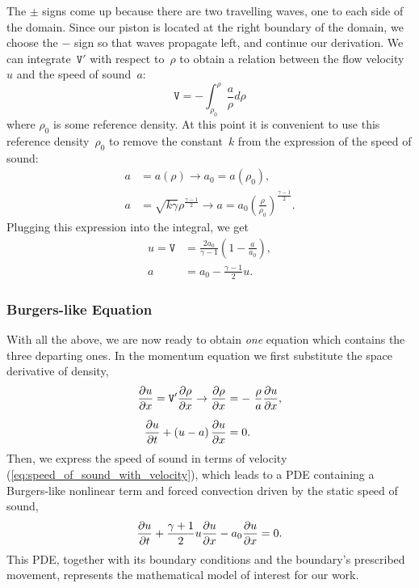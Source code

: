 \documentclass[../../thesis.tex]{subfiles}
\begin{document}
The $\pm$ signs come up because there are two travelling waves, one to each side of the domain.
Since our piston is located at the right boundary of the domain, 
we choose the $-$ sign so that waves propagate left, and continue our derivation.
We can integrate~$\mathtt{V}'$ with respect to~$\rho$ to obtain a relation between the flow velocity~$u$ and the speed of sound~$a$:
\begin{equation}
    \mathtt{V} = - \int_{\rho_0}^{\rho} \frac{a}{\rho} d\rho 
\end{equation}
where $\rho_0$ is some reference density.
At this point it is convenient to use this reference density~$\rho_0$ to remove the constant~$k$ from the expression of the speed of sound:
\begin{subequations}
    \begin{align}
        a &= a(\rho) 
        \rightarrow 
        a_0 = a(\rho_0),
        \\
        a &= \sqrt{k \gamma} \rho^{\frac{\gamma-1}{2}} 
        \rightarrow
        a = a_0 \left(\frac{\rho}{\rho_0}\right)^{\frac{\gamma-1}{2}}.
    \end{align}    
\end{subequations}
Plugging this expression into the integral, we get
\begin{subequations}
    \begin{align}
        u = \mathtt{V} &= \frac{2a_0}{\gamma-1}\left(1 - \frac{a}{a_0}\right),
        \\[2mm]
        a &= a_0 - \frac{\gamma-1}{2}u. \label{eq:speed_of_sound_with_velocity}
    \end{align}
\end{subequations}

\subsubsection{Burgers-like Equation}
With all the above, we are now ready to obtain \textit{one} equation which contains the three departing ones.
In the momentum equation we first substitute the space derivative of density,
\begin{subequations}
    \begin{align}
        \pdv{u}{x} = \mathtt{V}' \pdv{\rho}{x} \rightarrow \pdv{\rho}{x} &= - \frac{\rho}{a} \pdv{u}{x},
        \\[2mm]
        \pdv{u}{t} + \left(u-a\right)\pdv{u}{x} &= 0.
    \end{align}    
\end{subequations}
Then, we express the speed of sound in terms of velocity (\ref{eq:speed_of_sound_with_velocity}),
which leads to a PDE containing a Burgers-like nonlinear term and 
forced convection driven by the static speed of sound, 
\begin{equation}
    \pdv{u}{t} + \frac{\gamma+1}{2}u \pdv{u}{x} - a_0\pdv{u}{x} = 0.
\end{equation}
This PDE, together with its boundary conditions and the boundary's prescribed movement, represents the mathematical model of interest for our work. 
\end{document}
